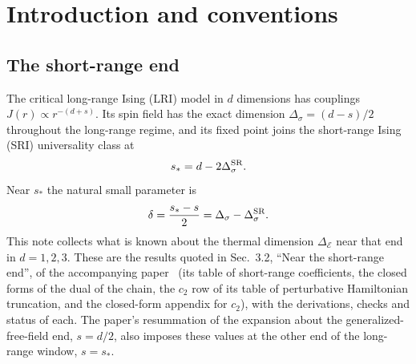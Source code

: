 \documentclass[11pt,a4paper]{article}
\numberwithin{equation}{section}
\newcommand{\De}{\Delta_{\mathcal E}}
\newcommand{\Ds}{\Delta_\sigma}
\newcommand{\CSR}{C^{\rm SR}}
\newcommand{\sci}[2]{#1\times10^{#2}}
\begin{document}
\begin{abstract}
linear sum of systematic diagnostics; its relative difference from the closed form is $\sci{1.9}{-4}$. In $d=3$,
$c_1=0.2732$, with the estimated range $[0.2690,0.2760]$, conditional on assumed gaps in the omitted spectrum and on
assumed ranges of the input data. Every
result carries its status word and caveats. The appendices give in full the derivations, proofs, methods and checks
of the supplied packages behind these results (the independent re-derivation, the Monte Carlo and the cylinder
continuum analysis are described in the main text), including the formal arguments that two couplings close under renormalization of the dual and
that its prescription extracts the local beta functions. Appendix~\ref{app:repro} maps each number to the package and
command that reproduce it, and a last appendix gives the magnetization-scheme calculation of $\CSR_8$ that the paper
quotes.
\end{abstract}

\clearpage
\setcounter{tocdepth}{2}
\begingroup\small\tableofcontents\endgroup
\clearpage

\section{Introduction and conventions}\label{sec:intro}
\subsection{The short-range end}
The critical long-range Ising (LRI) model in $d$ dimensions has couplings $J(r)\propto r^{-(d+s)}$. Its spin field has
the exact dimension $\Ds=(d-s)/2$ throughout the long-range regime, and its fixed point joins the short-range Ising
(SRI) universality class at
\begin{equation}
 s_*=d-2\Ds^{\rm SR}.
\end{equation}
Near $s_*$ the natural small parameter is
\begin{equation}
 \delta=\frac{s_*-s}{2}=\Ds-\Ds^{\rm SR}.
 \label{eq:delta}
\end{equation}
This note collects what is known about the thermal dimension $\De$ near that end in $d=1,2,3$. These are the results
quoted in Sec.~3.2, ``Near the short-range end'', of the accompanying paper~\cite{Paper} (its table of short-range
coefficients, the closed forms of the dual of the chain, the $c_2$ row of its table of perturbative Hamiltonian
truncation, and the closed-form appendix for $c_2$), with the derivations, checks and status of each. The paper's
resummation of the expansion about the generalized-free-field end, $s=d/2$, also imposes these values at the other
end of the long-range window, $s=s_*$.
\end{document}
